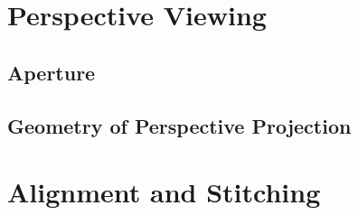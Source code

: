 \section{Perspective Viewing}

\subsection{Aperture}


\subsection{Geometry of Perspective Projection}


\section{Alignment and Stitching}

